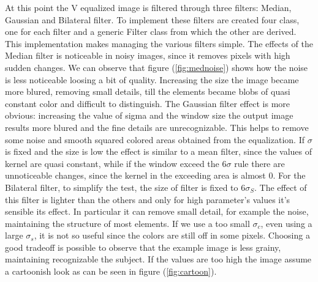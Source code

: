 \documentclass[11pt,a4paper]{article}
\newcommand{\cc}{\fontfamily{txtt}\selectfont}
\begin{document}
\newline
At this point the V equalized image is filtered through three filters: Median, Gaussian and Bilateral filter.
To implement these filters are created four class, one for each filter and a generic {\cc Filter} class from which the other are derived.
This implementation makes managing the various filters simple.\newline
The effects of the Median filter is noticeable in noisy images, since it removes pixels with high sudden changes.
We can observe that figure (\ref{fig:mednoise}) shows how the noise is less noticeable loosing a bit of quality.
Increasing the size the image became more blured, removing small details, till the elements became blobs of quasi constant color and difficult to distinguish.\newline
The Gaussian filter effect is more obvious: increasing the value of sigma and the window size the output image results more blured and the fine details are unrecognizable.
This helps to remove some noise and smooth squared colored areas obtained from the equalization.
If $\sigma$ is fixed and the size is low the effect is similar to a mean filter, since the values of kernel are quasi constant, while if the window exceed the 6$\sigma$ rule there are unnoticeable changes, since the kernel in the exceeding area is almost 0.\newline
For the Bilateral filter, to simplify the test, the size of filter is fixed to $6\sigma_{S}$.
The effect of this filter is lighter than the others and only for high parameter's values it's sensible its effect.
In particular it can remove small detail, for example the noise, maintaining the structure of most elements.
If we use a too small $\sigma_c$, even using a large $\sigma_s$, it is not so useful since the colors are still off in some pixels.
Choosing a good tradeoff is possible to observe that the example image is less grainy, maintaining recognizable the subject.
If the values are too high the image assume a cartoonish look as can be seen in figure (\ref{fig:cartoon}).
\end{document}
